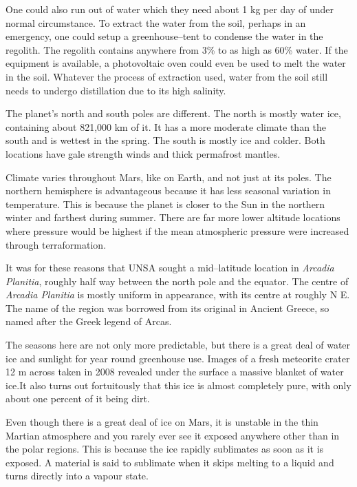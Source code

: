 One could also run out of water which they need about 1 kg per day of under normal circumstance. To extract the water from the soil, perhaps in an emergency, one could setup a greenhouse--tent to condense the water in the regolith. The regolith contains anywhere from 3\% to as high as 60\% water. If the equipment is available, a photovoltaic oven could even be used to melt the water in the soil. Whatever the process of extraction used, water from the soil still needs to undergo distillation due to its high salinity.


The planet's north and south poles are different. The north is mostly water ice, containing about 821,000 km of it. It has a more moderate climate than the south and is wettest in the spring. The south is mostly  ice and colder. Both locations have gale strength winds and thick permafrost mantles.

Climate varies throughout Mars, like on Earth, and not just at its poles. The northern hemisphere is advantageous because it has less seasonal variation in temperature. This is because the planet is closer to the Sun in the northern winter and farthest during summer. There are far more lower altitude locations where pressure would be highest if the mean atmospheric pressure were increased through terraformation.

It was for these reasons that UNSA sought a mid--latitude location in {\it Arcadia Planitia}, roughly half way between the north pole and the equator. The centre of {\it Arcadia Planitia} is mostly uniform in appearance, with its centre at roughly N E. The name of the region was borrowed from its original in Ancient Greece, so named after the Greek legend of Arcas.

The seasons here are not only more predictable, but there is a great deal of water ice and sunlight for year round greenhouse use. Images of a fresh meteorite crater 12 m across taken in 2008 revealed under the surface a massive blanket of water ice. It also turns out fortuitously that this ice is almost completely pure, with only about one percent of it being dirt.

Even though there is a great deal of ice on Mars, it is unstable in the thin Martian atmosphere and you rarely ever see it exposed anywhere other than in the polar regions. This is because the ice rapidly sublimates as soon as it is exposed. A material is said to sublimate when it skips melting to a liquid and turns directly into a vapour state. 

